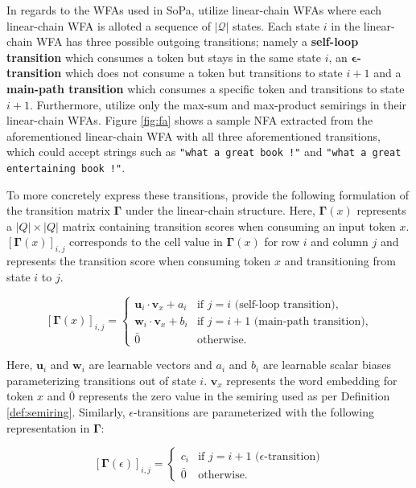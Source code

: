 In regards to the WFAs used in SoPa, \citet{schwartz2018sopa} utilize
linear-chain WFAs where each linear-chain WFA is alloted a sequence of
$|\mathcal{Q}|$ states. Each state $i$ in the linear-chain WFA has three
possible outgoing transitions; namely a \textbf{self-loop transition} which
consumes a token but stays in the same state $i$, an
\textbf{$\bm{\epsilon}$-transition} which does not consume a token but transitions to
state $i+1$ and a \textbf{main-path transition} which consumes a specific token
and transitions to state $i+1$. Furthermore, \citet{schwartz2018sopa} utilize
only the max-sum and max-product semirings in their linear-chain WFAs. Figure
\ref{fig:fa} shows a sample NFA extracted from the aforementioned linear-chain
WFA with all three aforementioned transitions, which could accept
strings such as \texttt{"what a great book !"} and \texttt{"what a great
  entertaining book !"}.

To more concretely express these transitions, \citet{schwartz2018sopa} provide
the following formulation of the transition matrix $\bm{\Gamma}$ under the
linear-chain structure. Here, $\bm{\Gamma}(x)$ represents a $|Q|\times|Q|$ matrix
containing transition scores when consuming an input token $x$. $[\bm{\Gamma}(x)]_{i,j}$
corresponds to the cell value in $\bm{\Gamma}(x)$ for row $i$ and column
$j$ and represents the transition score when consuming token $x$ and
transitioning from state $i$ to $j$.

\begin{equation}
  \label{eq:sopa_transition_matrix_main}
  [\bm{\Gamma}(x)]_{i,j} =
  \begin{cases}
    \bm{u}_i \cdot \bm{v}_x + a_i  & \text{if } j = i \text{ (self-loop transition),} \\
    \bm{w}_i \cdot \bm{v}_x + b_i  & \text{if } j = i + 1 \text{ (main-path transition),} \\
    \bar{0} & \text{otherwise.}
  \end{cases}
\end{equation}

Here, $\bm{u}_i$ and $\bm{w}_i$ are learnable vectors and $a_i$ and $b_i$ are
learnable scalar biases parameterizing transitions out of state $i$. $\bm{v}_x$
represents the word embedding for token $x$ and $\bar{0}$ represents the zero
value in the semiring used as per Definition \ref{def:semiring}. Similarly,
$\epsilon$-transitions are parameterized with the following representation in
$\bm{\Gamma}$:

\begin{equation}
  \label{eq:sopa_transition_matrix_epsilon}
  [\bm{\Gamma}(\epsilon)]_{i,j} =
  \begin{cases}
    c_i  & \text{if } j = i + 1 \text{ ($\epsilon$-transition)} \\
    \bar{0} & \text{otherwise.}
  \end{cases}
\end{equation}

